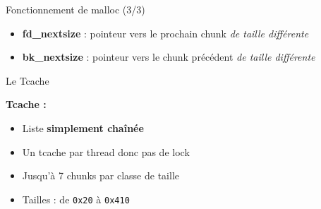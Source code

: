 \documentclass[10pt]{beamer}
\begin{document}
\begin{frame}{Fonctionnement de malloc (3/3)}
\begin{minipage}{0.50\textwidth}
\begin{itemize}
            \item \textbf{fd\_nextsize} : pointeur vers le prochain chunk
                  \emph{de taille différente}

            \item \textbf{bk\_nextsize} : pointeur vers le chunk précédent
                  \emph{de taille différente}

        \end{itemize}

    \end{minipage}

\end{frame}



\begin{frame}{Le Tcache}

    \begin{minipage}{0.40\textwidth}


    \end{minipage}
    \hfill
    \begin{minipage}{0.50\textwidth}

        \textbf{Tcache :}

        \begin{itemize}
            \item Liste \textbf{simplement chaînée}
            \item Un tcache par thread donc pas de lock
            \item Jusqu’à 7 chunks par classe de taille
            \item Tailles : de \texttt{0x20} à \texttt{0x410}
        \end{itemize}

    \end{minipage}

\end{frame}
\end{document}
